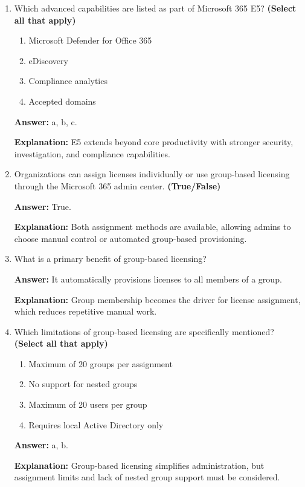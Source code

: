 \documentclass[10pt]{article}
\begin{document}
\begin{enumerate}[leftmargin=*]
\textbf{Explanation:} E3 includes the major productivity workloads, while some advanced security and compliance features sit in higher tiers.

\item Which advanced capabilities are listed as part of Microsoft 365 E5? \textbf{(Select all that apply)}
\begin{enumerate}[label=\alph*., leftmargin=1.5em]
\item Microsoft Defender for Office 365
\item eDiscovery
\item Compliance analytics
\item Accepted domains
\end{enumerate}
\textbf{Answer:} a, b, c.

\textbf{Explanation:} E5 extends beyond core productivity with stronger security, investigation, and compliance capabilities.

\item Organizations can assign licenses individually or use group-based licensing through the Microsoft 365 admin center. \textbf{(True/False)}

\textbf{Answer:} True.

\textbf{Explanation:} Both assignment methods are available, allowing admins to choose manual control or automated group-based provisioning.

\item What is a primary benefit of group-based licensing?

\textbf{Answer:} It automatically provisions licenses to all members of a group.

\textbf{Explanation:} Group membership becomes the driver for license assignment, which reduces repetitive manual work.

\item Which limitations of group-based licensing are specifically mentioned? \textbf{(Select all that apply)}
\begin{enumerate}[label=\alph*., leftmargin=1.5em]
\item Maximum of 20 groups per assignment
\item No support for nested groups
\item Maximum of 20 users per group
\item Requires local Active Directory only
\end{enumerate}
\textbf{Answer:} a, b.

\textbf{Explanation:} Group-based licensing simplifies administration, but assignment limits and lack of nested group support must be considered.


\end{enumerate}
\end{document}
